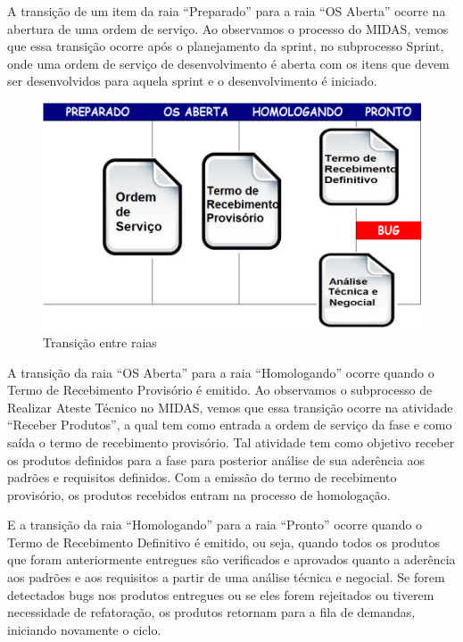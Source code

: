 A transição de um item da raia “Preparado” para a raia “OS Aberta” ocorre na abertura de uma ordem de serviço. Ao observamos o processo do MIDAS, vemos que essa transição ocorre após o planejamento da sprint, no subprocesso Sprint, onde uma ordem de serviço de desenvolvimento é aberta  com os itens que devem ser desenvolvidos para aquela sprint e o desenvolvimento é iniciado. 


\begin{figure}[h]
		\centering
		\label{fig07}
			\includegraphics[scale=0.5]{figuras/kanbanIPHAN3.png}
		\caption{Transição entre raias \cite{parente}}
\end{figure}

A transição da raia “OS Aberta” para a raia “Homologando” ocorre quando o Termo de Recebimento Provisório é emitido. Ao observamos o subprocesso de Realizar Ateste Técnico no MIDAS, vemos que essa transição ocorre na atividade “Receber Produtos”, a qual tem como entrada a ordem de serviço da fase e como saída o termo de recebimento provisório. Tal atividade tem como objetivo receber os produtos definidos para a fase para posterior análise de sua aderência aos padrões e requisitos definidos. Com a emissão do termo de recebimento provisório, os produtos recebidos entram na processo de homologação. 

E a transição da raia “Homologando” para a raia “Pronto” ocorre quando o Termo de Recebimento Definitivo é emitido, ou seja, quando todos os produtos que foram anteriormente entregues são verificados e aprovados quanto a aderência aos padrões e aos requisitos a partir de uma análise técnica e negocial. Se forem detectados bugs nos produtos entregues ou se eles forem rejeitados ou tiverem necessidade de refatoração, os produtos retornam para a fila de demandas, iniciando novamente o ciclo. 


